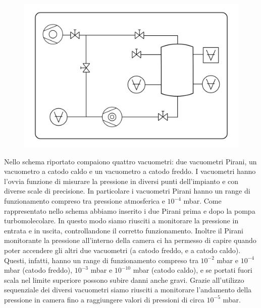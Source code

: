 \documentclass[11pt]{article}
\begin{document}
 \begin{center} 
\begin{figure}[H]
\hspace{-77.5pt}
\includegraphics[scale=0.5]{schema_finale.png}
\caption{}
\label{}
\end{figure}
\end{center}

  \hspace*{5mm}Nello schema riportato compaiono quattro vacuometri: due vacuometri Pirani, un vacuometro a catodo caldo e un vacuometro a catodo freddo. I vacuometri hanno l'ovvia funzione di misurare la pressione in diversi punti dell'impianto e con diverse scale di precisione. In particolare i vacuometri Pirani hanno un range di funzionamento compreso tra pressione atmosferica e $10^{-4}$ mbar. Come rappresentato nello schema abbiamo inserito i due Pirani prima e dopo la pompa turbomolecolare. In questo modo siamo riusciti a monitorare la pressione in entrata e in uscita, controllandone il corretto funzionamento. Inoltre il Pirani monitorante la pressione all'interno della camera ci ha permesso di capire quando poter accendere gli altri due vacuometri (a catodo freddo, e a catodo caldo). Questi, infatti, hanno un range di funzionamento compreso tra $10^{-2}$ mbar e $10^{-4}$ mbar (catodo freddo), $10^{-3}$ mbar e $10^{-10}$ mbar (catodo caldo), e se portati fuori scala nel limite superiore possono subire danni anche gravi. Grazie all'utilizzo sequenziale dei diversi vacuometri siamo riusciti a monitorare l'andamento della pressione in camera fino a raggiungere valori di pressioni di circa $10^{-5}$ mbar.
\end{document}
